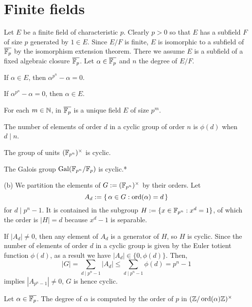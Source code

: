 \documentclass{../../large}
\begin{document}
\section{Finite fields}
\begin{prb}
Let $E$ be a finite field of characteristic $p$.
Clearly $p>0$ so that $E$ has a subfield $F$ of size $p$ generated by $1\in E$.
Since $E/F$ is finite, $E$ is isomorphic to a subfield of $\overline{\mathbb{F}_p}$ by the isomorphism extension theorem.
There we assume $E$ is a subfield of a fixed algebraic closure $\overline{\mathbb{F}_p}$.
Let $\alpha\in\overline{\mathbb{F}_p}$ and $n$ the degree of $E/F$.
\begin{parts}
\item If $\alpha\in E$, then $\alpha^{p^n}-\alpha=0$.
\item If $\alpha^{p^n}-\alpha=0$, then $\alpha\in E$.
\item For each $m\in\mathbb{N}$, in $\overline{\mathbb{F}_p}$ is a unique field $E$ of size $p^m$.
\end{parts}
\end{prb}


\begin{prb}
\begin{parts}
\item The number of elements of order $d$ in a cyclic group of order $n$ is $\phi(d)$ when $d\mid n$.
\item The group of units $(\mathbb{F}_{p^n})^\times$ is cyclic.
\item The Galois group $\operatorname{Gal}(\mathbb{F}_{p^n}/\mathbb{F}_p)$ is cyclic.*
\end{parts}
\end{prb}
\begin{pf}
(b)
We partition the elements of $G:=(\mathbb{F}_{p^n})^\times$ by their orders.
Let
\[A_d:=\{\,\alpha\in G:\operatorname{ord}(\alpha)=d\,\}\]
for $d\mid p^n-1$.
It is contained in the subgroup $H:=\{x\in\mathbb{F}_{p^n}:x^d=1\}$, of which the order is $|H|=d$ because $x^d-1$ is separable.

If $|A_d|\ne0$, then any element of $A_d$ is a generator of $H$, so $H$ is cyclic.
Since the number of elements of order $d$ in a cyclic group is given by the Euler totient function $\phi(d)$, as a result we have $|A_d|\in\{0,\phi(d)\}$.
Then,
\[|G|=\sum_{d\mid p^n-1}|A_d|\le\sum_{d\mid p^n-1}\phi(d)=p^n-1\]
implies $|A_{p^n-1}|\ne0$, $G$ is hence cyclic.
\end{pf}

\begin{prb}
Let $\alpha\in\overline{\mathbb{F}_p}$.
The degree of $\alpha$ is computed by the order of $p$ in $(\mathbb{Z}/\operatorname{ord}(\alpha)\mathbb{Z})^\times$
\end{prb}
\end{document}
